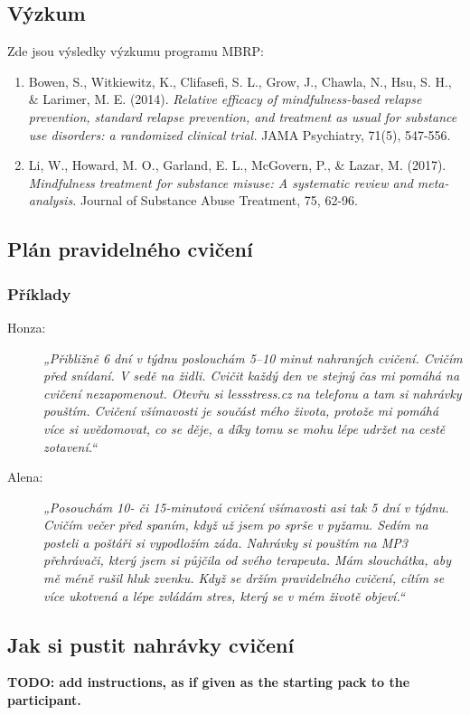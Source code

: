 	\subsection{Výzkum}
	Zde jsou výsledky výzkumu programu MBRP:

	\begin{enumerate}
		\item Bowen, S., Witkiewitz, K., Clifasefi, S. L., Grow, J., Chawla, N., Hsu, S. H., \& Larimer, M. E. (2014). \emph{Relative efficacy of mindfulness-based relapse prevention, standard relapse prevention, and treatment as usual for substance use disorders: a randomized clinical trial.} JAMA Psychiatry, 71(5), 547-556.
		\item Li, W., Howard, M. O., Garland, E. L., McGovern, P., \& Lazar, M. (2017). \emph{Mindfulness treatment for substance misuse: A systematic review and meta-analysis.} Journal of Substance Abuse Treatment, 75, 62-96.
	\end{enumerate}

	\subsection{Plán pravidelného cvičení \normalPencilLeftDown}
	\subsubsection{Příklady}
		\begin{description}
			\item[Honza:] \emph{„Přibližně 6 dní v týdnu poslouchám 5–10 minut nahraných cvičení. Cvičím před snídaní. V sedě na židli. Cvičit každý den ve stejný čas mi pomáhá na cvičení nezapomenout. Otevřu si lessstress.cz na telefonu a tam si nahrávky pouštím. Cvičení všímavosti je součást mého života, protože mi pomáhá více si uvědomovat, co se děje, a díky tomu se mohu lépe udržet na cestě zotavení.“}
			\item[Alena:] \emph{„Posouchám 10- či 15-minutová cvičení všímavosti asi tak 5 dní v týdnu. Cvičím večer před spaním, když už jsem po sprše v pyžamu. Sedím na posteli a poštáři si vypodložím záda. Nahrávky si pouštím na MP3 přehrávači, který jsem si půjčila od svého terapeuta. Mám slouchátka, aby mě méně rušil hluk zvenku. Když se držím pravidelného cvičení, cítím se více ukotvená a lépe zvládám stres, který se v mém životě objeví.“}
		\end{description}
	\subsection{Jak si pustit nahrávky cvičení}
		\textbf{TODO: add instructions, as if given as the starting pack to the participant.}


